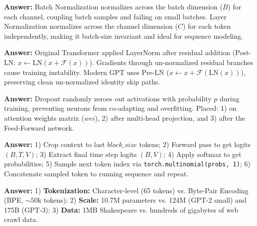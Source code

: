 \documentclass[10pt,a4paper]{article}
\begin{document}
\begin{tcolorbox}[title=Q11: Contrast Layer Normalization with Batch Normalization.]
\textbf{Answer:} Batch Normalization normalizes across the batch dimension ($B$) for each channel, coupling batch samples and failing on small batches. Layer Normalization normalizes across the channel dimension ($C$) for each token independently, making it batch-size invariant and ideal for sequence modeling.
\end{tcolorbox}

\begin{tcolorbox}[title=Q12: Why did modern GPT switch from Post-LN to Pre-LN?]
\textbf{Answer:} Original Transformer applied LayerNorm after residual addition (Post-LN: $x \leftarrow \text{LN}(x + \mathcal{F}(x))$). Gradients through un-normalized residual branches cause training instability. Modern GPT uses Pre-LN ($x \leftarrow x + \mathcal{F}(\text{LN}(x))$), preserving clean un-normalized identity skip paths.
\end{tcolorbox}

\begin{tcolorbox}[title=Q13: What does Dropout do, and where is it placed in GPT?]
\textbf{Answer:} Dropout randomly zeroes out activations with probability $p$ during training, preventing neurons from co-adapting and overfitting. Placed: 1) on attention weights matrix ($wei$), 2) after multi-head projection, and 3) after the Feed-Forward network.
\end{tcolorbox}

\begin{tcolorbox}[title=Q14: Detail the autoregressive text generation procedure at inference time.]
\textbf{Answer:} 1) Crop context to last $block\_size$ tokens; 2) Forward pass to get logits $(B, T, V)$; 3) Extract final time step logits $(B, V)$; 4) Apply softmax to get probabilities; 5) Sample next token index via \texttt{torch.multinomial(probs, 1)}; 6) Concatenate sampled token to running sequence and repeat.
\end{tcolorbox}

\begin{tcolorbox}[title=Q15: What distinguishes our model from production GPT-2 / GPT-3?]
\textbf{Answer:} 1) \textbf{Tokenization:} Character-level (65 tokens) vs. Byte-Pair Encoding (BPE, $\sim 50\text{k}$ tokens); 2) \textbf{Scale:} 10.7M parameters vs. 124M (GPT-2 small) and 175B (GPT-3); 3) \textbf{Data:} 1MB Shakespeare vs. hundreds of gigabytes of web crawl data.
\end{tcolorbox}
\end{document}
